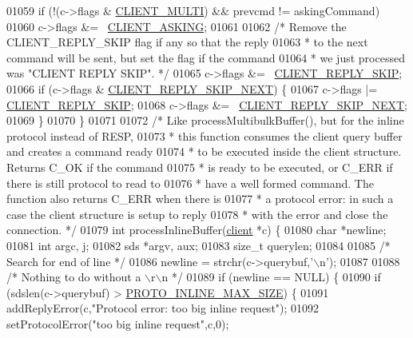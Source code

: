 \begin{DoxyCode}
{{{{{{{{{{{01059     \textcolor{keywordflow}{if} (!(c->flags & \hyperlink{server_8h_a7f61f783f429419f8c593291a509b03a}{CLIENT\_MULTI}) && prevcmd != askingCommand)
01060         c->flags &= ~\hyperlink{server_8h_a108ac316dfd847430daf3c97f28557d3}{CLIENT\_ASKING};
01061 
01062     \textcolor{comment}{/* Remove the CLIENT\_REPLY\_SKIP flag if any so that the reply}
01063 \textcolor{comment}{     * to the next command will be sent, but set the flag if the command}
01064 \textcolor{comment}{     * we just processed was "CLIENT REPLY SKIP". */}
01065     c->flags &= ~\hyperlink{server_8h_a792a906c445537043944477fdaad11f4}{CLIENT\_REPLY\_SKIP};
01066     \textcolor{keywordflow}{if} (c->flags & \hyperlink{server_8h_a8d5a7abb547f5b34961d11900bd95b00}{CLIENT\_REPLY\_SKIP\_NEXT}) \{
01067         c->flags |= \hyperlink{server_8h_a792a906c445537043944477fdaad11f4}{CLIENT\_REPLY\_SKIP};
01068         c->flags &= ~\hyperlink{server_8h_a8d5a7abb547f5b34961d11900bd95b00}{CLIENT\_REPLY\_SKIP\_NEXT};
01069     \}
01070 \}
01071 
01072 \textcolor{comment}{/* Like processMultibulkBuffer(), but for the inline protocol instead of RESP,}
01073 \textcolor{comment}{ * this function consumes the client query buffer and creates a command ready}
01074 \textcolor{comment}{ * to be executed inside the client structure. Returns C\_OK if the command}
01075 \textcolor{comment}{ * is ready to be executed, or C\_ERR if there is still protocol to read to}
01076 \textcolor{comment}{ * have a well formed command. The function also returns C\_ERR when there is}
01077 \textcolor{comment}{ * a protocol error: in such a case the client structure is setup to reply}
01078 \textcolor{comment}{ * with the error and close the connection. */}
01079 \textcolor{keywordtype}{int} processInlineBuffer(\hyperlink{structclient}{client} *c) \{
01080     \textcolor{keywordtype}{char} *newline;
01081     \textcolor{keywordtype}{int} argc, j;
01082     sds *argv, aux;
01083     size\_t querylen;
01084 
01085     \textcolor{comment}{/* Search for end of line */}
01086     newline = strchr(c->querybuf,\textcolor{stringliteral}{'\(\backslash\)n'});
01087 
01088     \textcolor{comment}{/* Nothing to do without a \(\backslash\)r\(\backslash\)n */}
01089     \textcolor{keywordflow}{if} (newline == NULL) \{
01090         \textcolor{keywordflow}{if} (sdslen(c->querybuf) > \hyperlink{server_8h_a8214e9e04b3a27e8e38d35cda0f55874}{PROTO\_INLINE\_MAX\_SIZE}) \{
01091             addReplyError(c,\textcolor{stringliteral}{"Protocol error: too big inline request"});
01092             setProtocolError(\textcolor{stringliteral}{"too big inline request"},c,0);
}}}}}}}}}}}
\end{DoxyCode}
